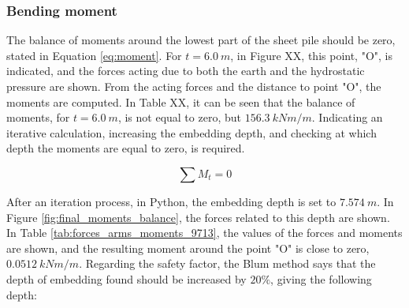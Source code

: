 


\subsubsection{Bending moment}

The balance of moments around the lowest part of the sheet pile should be zero,  stated in Equation \ref{eq:moment}. For $t = 6.0 \ m$, in Figure XX, this point, "O", is indicated, and the forces acting due to both the earth and the hydrostatic pressure are shown. From the acting forces and the distance to point "O", the moments are computed. In Table XX, it can be seen that the balance of moments, for $t = 6.0 \ m$, is not equal to zero, but $156.3 \ kNm/m$. Indicating an iterative calculation, increasing the embedding depth, and checking at which depth the moments are equal to zero, is required.

\begin{equation}
    \sum{M_{t}} = 0
    \label{eq:moment}
\end{equation}

 After an iteration process, in Python, the embedding depth is set to $7.574 \ m$. In Figure \ref{fig:final_moments_balance}, the forces related to this depth are shown. In Table \ref{tab:forces_arms_moments_9713}, the values of the forces and moments are shown, and the resulting moment around the point "O" is close to zero, $0.0512 \ kNm/m$. Regarding the safety factor, the Blum method says that the depth of embedding found should be increased by $20\%$, giving the following depth:

